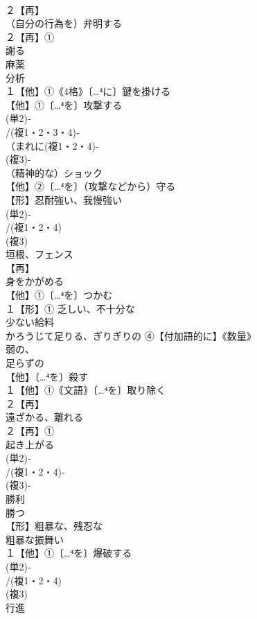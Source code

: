 \documentclass[8pt]{extreport}
\begin{document}
\begin{CJK}{UTF8}{min}
\\	２【再】
\\	（自分の行為を）弁明する
\\	２【再】①
\\	謝る
\\	麻薬　
\\	分析 
\\	１【他】①《4格》〔…⁴に〕鍵を掛ける 
\\	【他】①〔…⁴を〕攻撃する 
\\	(単2)‐
\\	/(複1・2・3・4)‐
\\	（まれに(複1・2・4)-
\\	(複3)-
\\	（精神的な）ショック
\\	【他】②〔…⁴を〕（攻撃などから）守る
\\	【形】忍耐強い、我慢強い 
\\	(単2)‐
\\	/(複1・2・4)
\\	(複3)
\\	垣根、フェンス 
\\	【再】
\\	身をかがめる 
\\	【他】①〔…⁴を〕つかむ 
\\	１【形】① 乏しい、不十分な 
\\	少ない給料 
\\	かろうじて足りる、ぎりぎりの ④【付加語的に】《数量》
\\	弱の、
\\	足らずの
\\	【他】〔…⁴を〕殺す 
\\	１【他】①｟文語｠〔…⁴を〕取り除く 
\\	２【再】
\\	遠ざかる、離れる
\\	２【再】①
\\	起き上がる
\\	(単2)‐
\\	/(複1・2・4)-
\\	(複3)-
\\	勝利 
\\	勝つ
\\	【形】粗暴な、残忍な 
\\	粗暴な振舞い 
\\	１【他】①〔…⁴を〕爆破する 
\\	(単2)‐
\\	/(複1・2・4)
\\	(複3)
\\	行進 

\end{CJK}
\end{document}
